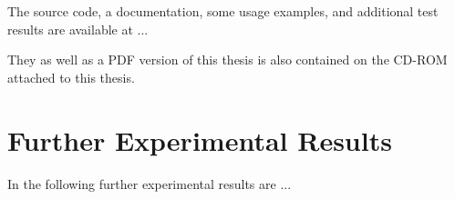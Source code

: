 \documentclass[11pt,titlepage,oneside,openany]{book}
\begin{document}
The source code, a documentation, some usage examples, and additional test results are available at ...

They as well as a PDF version of this thesis is also contained on the CD-ROM attached to this thesis.

\chapter{Further Experimental Results}
\label{cha:appendix-b}

In the following further experimental results are ...


\newpage
\end{document}
